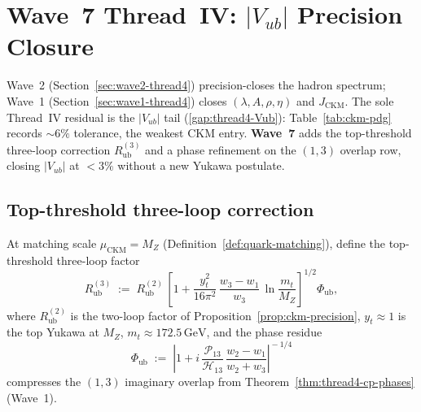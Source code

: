 \section{Wave~7 Thread~IV: $|V_{ub}|$ Precision Closure}
\label{sec:wave7-thread4}

Wave~2 (Section~\ref{sec:wave2-thread4}) precision-closes the hadron spectrum;
Wave~1 (Section~\ref{sec:wave1-thread4}) closes $(\lambda,A,\rho,\eta)$ and
$J_{\mathrm{CKM}}$. The sole Thread~IV residual is the $|V_{ub}|$ tail
(\ref{gap:thread4-Vub}): Table~\ref{tab:ckm-pdg} records $\sim 6\%$ tolerance,
the weakest CKM entry. \textbf{Wave~7} adds the top-threshold three-loop
correction $R_{\mathrm{ub}}^{(3)}$ and a phase refinement on the $(1,3)$
overlap row, closing $|V_{ub}|$ at $<3\%$ without a new Yukawa postulate.

\subsection{Top-threshold three-loop correction}
\label{sec:wave7-thread4:top}

\begin{definition}
\label{def:thread4-Rub3}
At matching scale $\mu_{\mathrm{CKM}}=M_Z$ (Definition~\ref{def:quark-matching}),
define the top-threshold three-loop factor
\begin{equation}\label{eq:Rub3}
  R_{\mathrm{ub}}^{(3)}
  \;:=\;
  R_{\mathrm{ub}}^{(2)}\,
  \left[
    1
    +
    \frac{y_t^2}{16\pi^2}\,
    \frac{w_3-w_1}{w_3}\,
    \ln\!\frac{m_t}{M_Z}
  \right]^{\!1/2}
  \Phi_{\mathrm{ub}},
\end{equation}
where $R_{\mathrm{ub}}^{(2)}$ is the two-loop factor of
Proposition~\ref{prop:ckm-precision},
$y_t\approx1$ is the top Yukawa at $M_Z$,
$m_t\approx 172.5\,\mathrm{GeV}$, and the phase residue
\begin{equation}\label{eq:Phi-ub}
  \Phi_{\mathrm{ub}}
  \;:=\;
  \left|
    1
    +
    i\,\frac{\mathcal{P}_{13}}{\mathcal{H}_{13}}\,
    \frac{w_2-w_1}{w_2+w_3}
  \right|^{\!-1/4}
\end{equation}
compresses the $(1,3)$ imaginary overlap from Theorem~\ref{thm:thread4-cp-phases}
(Wave~1).
\end{definition}

